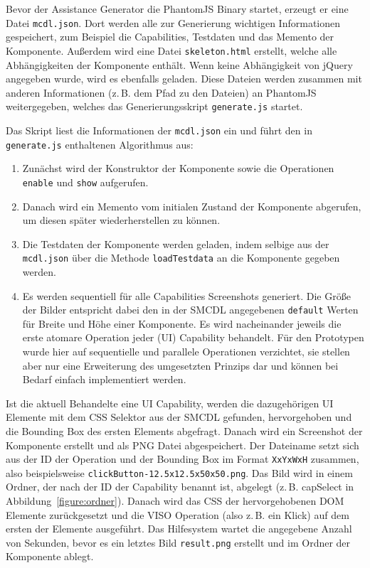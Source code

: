 \documentclass[
	headsepline,
	footsepline,
	fontsize=12pt,
	bibliography=totoc
]{scrbook}
\begin{document}
Bevor der Assistance Generator die PhantomJS Binary startet, erzeugt er eine Datei \texttt{mcdl.json}. Dort werden alle zur Generierung wichtigen Informationen gespeichert, zum Beispiel die Capabilities, Testdaten und das Memento der Komponente. Außerdem wird eine Datei \texttt{skeleton.html} erstellt, welche alle Abhängigkeiten der Komponente enthält. Wenn keine Abhängigkeit von jQuery angegeben wurde, wird es ebenfalls geladen. Diese Dateien werden zusammen mit anderen Informationen (z.\,B. dem Pfad zu den Dateien) an PhantomJS weitergegeben, welches das Generierungsskript \texttt{generate.js} startet.

Das Skript liest die Informationen der \texttt{mcdl.json} ein und führt den in \texttt{generate.js} enthaltenen Algorithmus aus:

\begin{enumerate}
	\item Zunächst wird der Konstruktor der Komponente sowie die Operationen \texttt{enable} und \texttt{show} aufgerufen.
	\item Danach wird ein Memento vom initialen Zustand der Komponente abgerufen, um diesen später wiederherstellen zu können.
	\item Die Testdaten der Komponente werden geladen, indem selbige aus der \texttt{mcdl.json} über die Methode \texttt{loadTestdata} an die Komponente gegeben werden.
	\item Es werden sequentiell für alle Capabilities Screenshots generiert. Die Größe der Bilder entspricht dabei den in der SMCDL angegebenen \texttt{default} Werten für Breite und Höhe einer Komponente. Es wird nacheinander jeweils die erste atomare Operation jeder (UI) Capability behandelt. Für den Prototypen wurde hier auf sequentielle und parallele Operationen verzichtet, sie stellen aber nur eine Erweiterung des umgesetzten Prinzips dar und können bei Bedarf einfach implementiert werden.
\end{enumerate}

Ist die aktuell Behandelte eine UI Capability, werden die dazugehörigen UI Elemente mit dem CSS Selektor aus der SMCDL gefunden, hervorgehoben und die Bounding Box des ersten Elements abgefragt. Danach wird ein Screenshot der Komponente erstellt und als PNG Datei abgespeichert. Der Dateiname setzt sich aus der ID der Operation und der Bounding Box im Format \texttt{XxYxWxH} zusammen, also beispielsweise \texttt{clickButton-12.5x12.5x50x50.png}. Das Bild wird in einem Ordner, der nach der ID der Capability benannt ist, abgelegt (z.\,B. capSelect in Abbildung~\ref{figure:ordner}). Danach wird das CSS der hervorgehobenen DOM Elemente zurückgesetzt und die VISO Operation (also z.\,B. ein Klick) auf dem ersten der Elemente ausgeführt. Das Hilfesystem wartet die angegebene Anzahl von Sekunden, bevor es ein letztes Bild \texttt{result.png} erstellt und im Ordner der Komponente ablegt.
\end{document}
